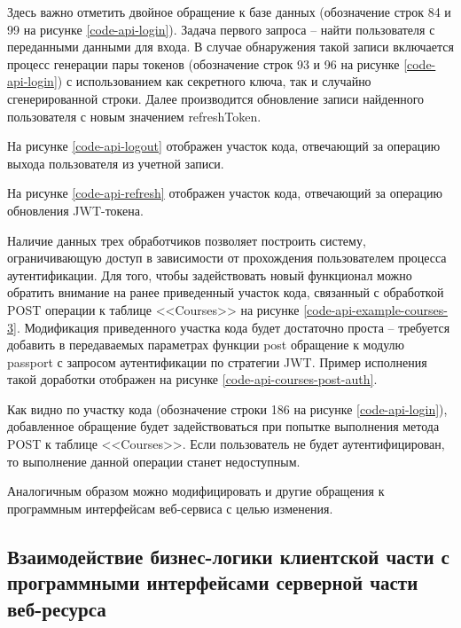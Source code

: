 Здесь важно отметить двойное обращение к базе данных (обозначение строк 84 и 99 на рисунке \ref{code-api-login}).
Задача первого запроса -- найти пользователя с переданными данными для входа.
В случае обнаружения такой записи включается процесс генерации пары токенов (обозначение строк 93 и 96 на рисунке \ref{code-api-login}) с использованием как секретного ключа, так и случайно сгенерированной строки.
Далее производится обновление записи найденного пользователя с новым значением refreshToken.

На рисунке \ref{code-api-logout} отображен участок кода, отвечающий за операцию выхода пользователя из учетной записи.


На рисунке \ref{code-api-refresh} отображен участок кода, отвечающий за операцию обновления JWT-токена.


Наличие данных трех обработчиков позволяет построить систему, ограничивающую доступ в зависимости от прохождения пользователем процесса аутентификации.
Для того, чтобы задействовать новый функционал можно обратить внимание на ранее приведенный участок кода, связанный с обработкой POST операции к таблице <<Courses>> на рисунке \ref{code-api-example-courses-3}.
Модификация приведенного участка кода будет достаточно проста -- требуется добавить в передаваемых параметрах функции post обращение к модулю passport с запросом аутентификации по стратегии JWT.
Пример исполнения такой доработки отображен на рисунке \ref{code-api-courses-post-auth}.


Как видно по участку кода (обозначение строки 186 на рисунке \ref{code-api-login}), добавленное обращение будет задействоваться при попытке выполнения метода POST к таблице <<Courses>>.
Если пользователь не будет аутентифицирован, то выполнение данной операции станет недоступным.

Аналогичным образом можно модифицировать и другие обращения к программным интерфейсам веб-сервиса с целью изменения.


\subsection{Взаимодействие бизнес-логики клиентской части с программными интерфейсами серверной части веб-ресурса}

